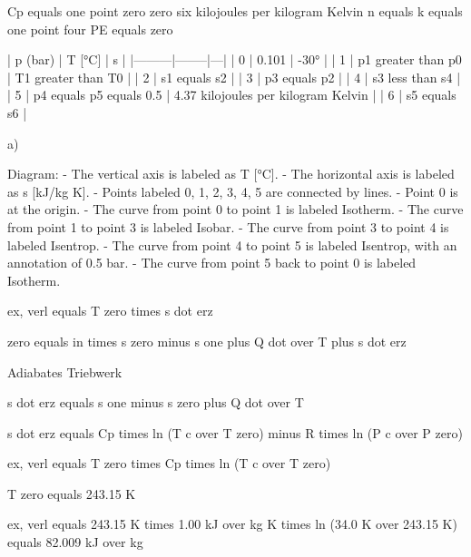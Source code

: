 Cp equals one point zero zero six kilojoules per kilogram Kelvin  
n equals k equals one point four  
PE equals zero  

| p (bar) | T [°C] | s |  
|---------|--------|---|  
| 0       | 0.101  | -30°       |  
| 1       | p1 greater than p0 | T1 greater than T0 |  
| 2       | s1 equals s2 |  
| 3       | p3 equals p2 |  
| 4       | s3 less than s4 |  
| 5       | p4 equals p5 equals 0.5 | 4.37 kilojoules per kilogram Kelvin |  
| 6       | s5 equals s6 |  

a)  

Diagram:  
- The vertical axis is labeled as T [°C].  
- The horizontal axis is labeled as s [kJ/kg K].  
- Points labeled 0, 1, 2, 3, 4, 5 are connected by lines.  
- Point 0 is at the origin.  
- The curve from point 0 to point 1 is labeled Isotherm.  
- The curve from point 1 to point 3 is labeled Isobar.  
- The curve from point 3 to point 4 is labeled Isentrop.  
- The curve from point 4 to point 5 is labeled Isentrop, with an annotation of 0.5 bar.  
- The curve from point 5 back to point 0 is labeled Isotherm.

ex, verl equals T zero times s dot erz

zero equals in times s zero minus s one plus Q dot over T plus s dot erz

Adiabates Triebwerk

s dot erz equals s one minus s zero plus Q dot over T

s dot erz equals Cp times ln (T c over T zero) minus R times ln (P c over P zero)

ex, verl equals T zero times Cp times ln (T c over T zero)

T zero equals 243.15 K

ex, verl equals 243.15 K times 1.00 kJ over kg K times ln (34.0 K over 243.15 K) equals 82.009 kJ over kg